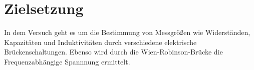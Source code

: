 \section{Zielsetzung} 

\begin{flushleft}
    In dem Versuch geht es um die Bestimmung von Messgrößen wie Widerständen, Kapazitäten und Induktivitäten durch verschiedene elektrische Brückenschaltungen.
    Ebenso wird durch die Wien-Robinson-Brücke die Frequenzabhängige Spannnung ermittelt.
\end{flushleft}